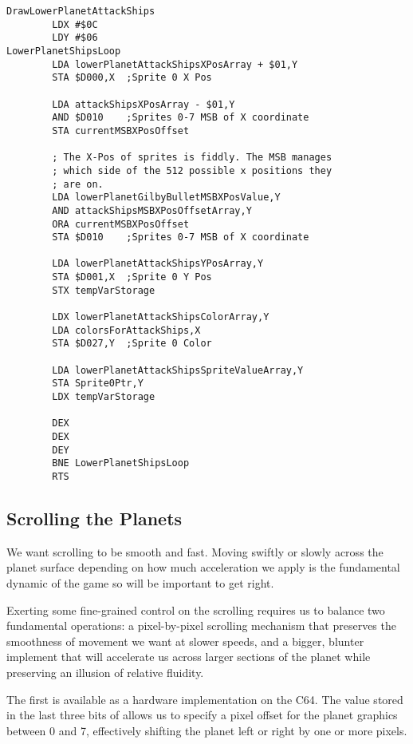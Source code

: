 \begin{minipage}[b]{0.55\linewidth}
\centering
\begin{lstlisting}[basicstyle=\tiny]
DrawLowerPlanetAttackShips
        LDX #$0C
        LDY #$06
LowerPlanetShipsLoop   
        LDA lowerPlanetAttackShipsXPosArray + $01,Y
        STA $D000,X  ;Sprite 0 X Pos

        LDA attackShipsXPosArray - $01,Y
        AND $D010    ;Sprites 0-7 MSB of X coordinate
        STA currentMSBXPosOffset

        ; The X-Pos of sprites is fiddly. The MSB manages
        ; which side of the 512 possible x positions they
        ; are on.
        LDA lowerPlanetGilbyBulletMSBXPosValue,Y
        AND attackShipsMSBXPosOffsetArray,Y
        ORA currentMSBXPosOffset
        STA $D010    ;Sprites 0-7 MSB of X coordinate

        LDA lowerPlanetAttackShipsYPosArray,Y
        STA $D001,X  ;Sprite 0 Y Pos
        STX tempVarStorage

        LDX lowerPlanetAttackShipsColorArray,Y
        LDA colorsForAttackShips,X
        STA $D027,Y  ;Sprite 0 Color

        LDA lowerPlanetAttackShipsSpriteValueArray,Y
        STA Sprite0Ptr,Y
        LDX tempVarStorage

        DEX
        DEX
        DEY
        BNE LowerPlanetShipsLoop
        RTS
\end{lstlisting}
\end{minipage}

\subsection{Scrolling the Planets}
We want scrolling to be smooth and fast. Moving swiftly or slowly across the planet surface
depending on how much acceleration we apply is the fundamental dynamic of the game so will
be important to get right.

Exerting some fine-grained control on the scrolling requires us to balance
two fundamental operations: a pixel-by-pixel scrolling mechanism that preserves the smoothness
of movement we want at slower speeds, and a bigger, blunter implement that will accelerate
us across larger sections of the planet while preserving an illusion of relative fluidity.

The first is available as a hardware implementation on the C64. The value stored in the last
three bits of  allows us to specify a pixel offset for the planet graphics between
0 and 7, effectively shifting the planet left or right by one or more pixels.

